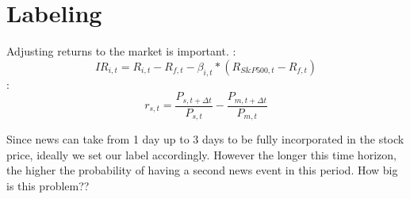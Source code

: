 \documentclass[12pt,a4paper]{article}
\begin{document}
	\section{Labeling}
	Adjusting returns to the market is important.
	\cite{salbrechter_financial_2021-1}:
	$$
	I R_{i, t}=R_{i, t}-R_{f, t}-\beta_{i, t} *\left(R_{S \& P 500, t}-R_{f, t}\right)
	$$
	\cite{chen_stock_2021}:
	$$
	r_{s, t}=\frac{P_{s, t+\Delta t}}{P_{s, t}}-\frac{P_{m, t+\Delta t}}{P_{m, t}}
	$$
	
	
	Since news can take from 1 day up to 3 days to be fully incorporated in the stock price, ideally we set our label accordingly.
	However the longer this time horizon, the higher the probability of having a second news event in this period.
	How big is this problem??
	
	
	
	
	
\end{document}

